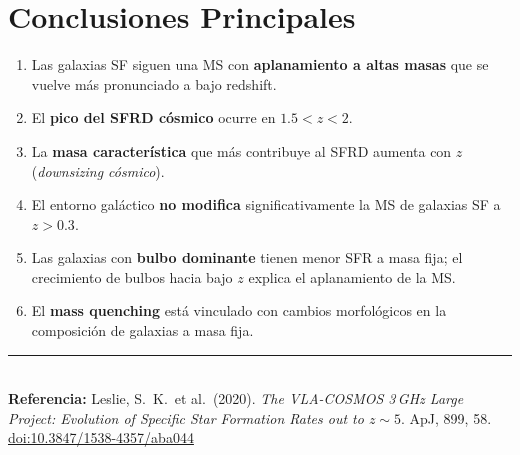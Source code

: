 \documentclass[12pt, a4paper]{article}
\begin{document}
\section{Conclusiones Principales}

\begin{enumerate}[leftmargin=2em]
    \item Las galaxias SF siguen una MS con \textbf{aplanamiento a altas masas}
          que se vuelve más pronunciado a bajo redshift.
    \item El \textbf{pico del SFRD cósmico} ocurre en $1.5 < z < 2$.
    \item La \textbf{masa característica} que más contribuye al SFRD aumenta
          con $z$ (\textit{downsizing cósmico}).
    \item El entorno galáctico \textbf{no modifica} significativamente la MS
          de galaxias SF a $z > 0.3$.
    \item Las galaxias con \textbf{bulbo dominante} tienen menor SFR a masa
          fija; el crecimiento de bulbos hacia bajo $z$ explica el aplanamiento
          de la MS.
    \item El \textbf{mass quenching} está vinculado con cambios morfológicos
          en la composición de galaxias a masa fija.
\end{enumerate}

\vspace{1cm}
\noindent\rule{\linewidth}{0.5pt}\\
{\small \textbf{Referencia:} Leslie, S.\ K.\ et al.\ (2020).
\textit{The VLA-COSMOS 3\,GHz Large Project: Evolution of Specific Star
Formation Rates out to $z\sim5$}. ApJ, 899, 58.
\href{https://doi.org/10.3847/1538-4357/aba044}{doi:10.3847/1538-4357/aba044}}
\end{document}
